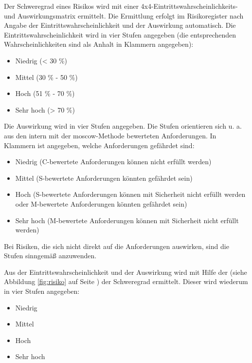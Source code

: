 \documentclass[a4paper,11pt,listof=numbered,glossary=totoc,parskip=half,toc=bib]{scrreprt}
\begin{document}
{Der Schweregrad eines Risikos wird mit einer 4x4-Eintrittswahrscheinlichkeits- und Auswirkungsmatrix ermittelt. Die Ermittlung erfolgt im Risikoregister nach Angabe der Eintrittswahrscheinlichkeit und der Auswirkung automatisch.
Die Eintrittswahrscheinlichkeit wird in vier Stufen angegeben (die entsprechenden Wahrscheinlichkeiten sind als Anhalt in Klammern angegeben):
\begin{itemize}
	\item Niedrig (< 30 \%)
	\item Mittel (30 \% - 50 \%)
	\item Hoch (51 \% - 70 \%)
	\item Sehr hoch (> 70 \%)
\end{itemize}

Die Auswirkung wird in vier Stufen angegeben. Die Stufen orientieren sich u. a. aus den intern mit der \Gls{moscow}-Methode bewerteten Anforderungen. In Klammern ist angegeben, welche Anforderungen gefährdet sind:

\begin{itemize}
	\item Niedrig (C-bewertete Anforderungen können nicht erfüllt werden)
	\item Mittel (S-bewertete Anforderungen könnten gefährdet sein)
	\item Hoch (S-bewertete Anforderungen können mit Sicherheit nicht erfüllt werden oder M-bewertete Anforderungen könnten gefährdet sein)
	\item Sehr hoch (M-bewertete Anforderungen können mit Sicherheit nicht erfüllt werden)
\end{itemize}

Bei Risiken, die sich nicht direkt auf die Anforderungen auswirken, sind die Stufen sinngemäß anzuwenden.

Aus der Eintrittswahrscheinlichkeit und der Auswirkung wird mit Hilfe der  (siehe Abbildung \ref{fig:risiko} auf Seite \pageref{fig:risiko}) der Schweregrad ermittelt. Dieser wird wiederum in vier Stufen angegeben:

\begin{itemize}
	\item Niedrig
	\item Mittel
	\item Hoch
	\item Sehr hoch
\end{itemize}

}
\end{document}
